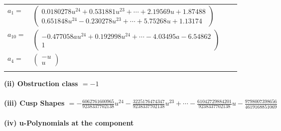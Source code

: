 \documentclass[1p]{elsarticle_modified}
\theoremstyle{definition}
\begin{document}
\begin{tabular}{m{7pt} m{180pt} m{7pt} m{180pt} }
\flushright $a_{1}=$&$\begin{pmatrix}0.0180278 u^{24}+0.531881 u^{23}+\cdots+2.19569 u+1.87488\\0.651848 u^{24}-0.230278 u^{23}+\cdots+5.75268 u+1.13174\end{pmatrix}$ \\
\flushright $a_{10}=$&$\begin{pmatrix}-0.477058 a u^{24}+0.192998 u^{24}+\cdots-4.03495 a-6.54862\\1\end{pmatrix}$ \\
\flushright $a_{4}=$&$\begin{pmatrix}- u\\u\end{pmatrix}$\\&\end{tabular}
\flushleft \textbf{(ii) Obstruction class $= -1$}\\~\\
\flushleft \textbf{(iii) Cusp Shapes $= -\frac{6062761600965}{9238337702138} u^{24}-\frac{3225176474347}{9238337702138} u^{23}+\cdots-\frac{61042729884201}{9238337702138} u-\frac{9798007398656}{4619168851069}$}\\~\\
\newpage\renewcommand{\arraystretch}{1}
\flushleft \textbf{(iv) u-Polynomials at the component}\newline \\
\end{document}
